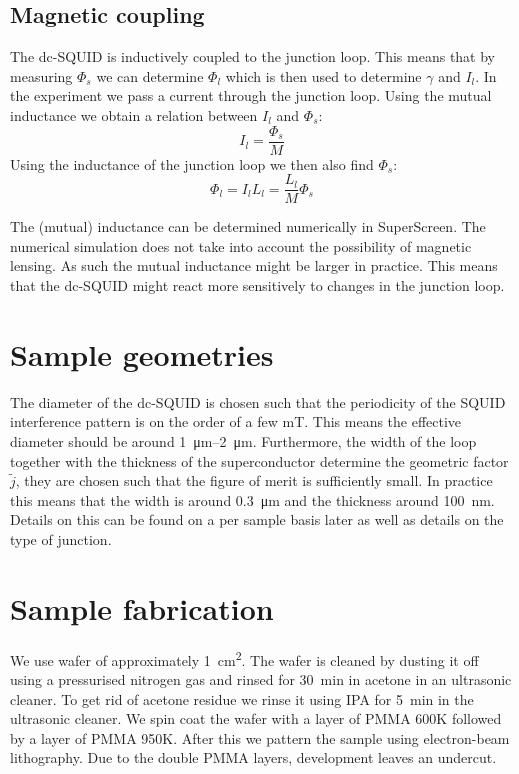 \subsection{Magnetic coupling}
\label{sec:magnetic-coupling}
The dc-SQUID is inductively coupled to the junction loop. This means that by measuring $\Phi_s$ we can determine $\Phi_l$ which is then used to determine $\gamma$ and $I_l$. In the experiment we pass a current through the junction loop. Using the mutual inductance we obtain a relation between $I_l$ and $\Phi_s$:
\begin{equation}
	I_l = \frac{\Phi_s}{M}
\end{equation}
Using the inductance of the junction loop we then also find $\Phi_s$:
\begin{equation}
	\Phi_l = I_lL_l = \frac{L_l}{M}\Phi_s
\end{equation}

The (mutual) inductance can be determined numerically in SuperScreen.\cite{bishop-vanhornSuperScreenOpensourcePackage2022} The numerical simulation does not take into account the possibility of magnetic lensing.\cite{prigozhin3DSimulationSuperconducting2018} As such the mutual inductance might be larger in practice. This means that the dc-SQUID might react more sensitively to changes in the junction loop.

\section{Sample geometries}
The diameter of the dc-SQUID is chosen such that the periodicity of the SQUID interference pattern is on the order of a few \unit{\milli\tesla}. This means the effective diameter should be around \qtyrange{1}{2}{\micro\meter}. Furthermore, the width of the loop together with the thickness of the superconductor determine the geometric factor $\tilde{j}$, they are chosen such that the figure of merit is sufficiently small. In practice this means that the width is around \qty{0.3}{\micro\meter} and the thickness around \qty{100}{\nano\meter}. Details on this can be found on a per sample basis later as well as details on the type of junction.

\section{Sample fabrication}
\label{sec:method-sample-fabrication}
We use  wafer of approximately \qty{1}{\square\centi\meter}. The wafer is cleaned by dusting it off using a pressurised nitrogen gas and rinsed for \qty{30}{\minute} in acetone in an ultrasonic cleaner. To get rid of acetone residue we rinse it using IPA for \qty{5}{\minute} in the ultrasonic cleaner. We spin coat the wafer with a layer of PMMA 600K followed by a layer of PMMA 950K. After this we pattern the sample using electron-beam lithography. Due to the double PMMA layers, development leaves an undercut.

